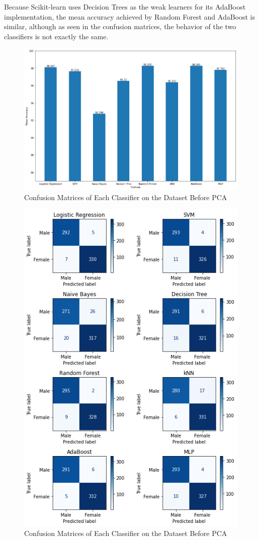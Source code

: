 \documentclass[journal,onecolumn]{IEEEtran}
\begin{document}
Because Scikit-learn uses Decision Trees as the weak learners for its AdaBoost implementation, the mean accuracy achieved by Random Forest and AdaBoost
is similar, although as seen in the confusion matrices, the behavior of the two classifiers is not exactly the same.
\begin{figure}[h]
  \centering
  \includegraphics[width=0.95\linewidth]{figures/no_pca_comparison.png}
  \caption{Confusion Matrices of Each Classifier on the Dataset Before PCA}
  \label{fig:no_pca_comp}
\end{figure}
\begin{figure}[hbtp]
  \centering
  \includegraphics[width=0.8\linewidth]{figures/no_pca_conf_mats.png}
  \caption{Confusion Matrices of Each Classifier on the Dataset Before PCA}
  \label{fig:no_pca_cm}
\end{figure}
\clearpage
\end{document}
